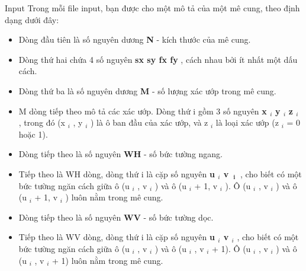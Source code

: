 Input
Trong mỗi file input, bạn được cho một mô tả của một mê cung, theo định dạng dưới đây:
\begin{itemize}
	\item Dòng đầu tiên là số nguyên dương \textbf{ N } - kích thước của mê cung.
	\item Dòng thứ hai chứa 4 số nguyên \textbf{ sx sy fx fy } , cách nhau bởi ít nhất một dấu cách.
	\item Dòng thứ ba là số nguyên dương \textbf{ M } - số lượng xác ướp trong mê cung.
	\item M dòng tiếp theo mô tả các xác ướp. Dòng thứ i gồm 3 số nguyên \textbf{ x $_ i $}\textbf{ y $_ i $}\textbf{ z $_ i $} , trong đó (x $_ i $ , y $_ i $ ) là ô ban đầu của xác ướp, và z $_ i $ là loại xác ướp (z $_ i $ = 0 hoặc 1).
	\item Dòng tiếp theo là số nguyên \textbf{ WH } - số bức tường ngang.
	\item Tiếp theo là WH dòng, dòng thứ i là cặp số nguyên \textbf{ u $_ i $ v }$_\textbf{ i }$ , cho biết có một bức tường ngăn cách giữa ô (u $_ i $ , v $_ i $ ) và ô (u $_ i $ + 1, v $_ i $ ). Ô (u $_ i $ , v $_ i $ ) và ô (u $_ i $ + 1, v $_ i $ ) luôn nằm trong mê cung.
	\item Dòng tiếp theo là số nguyên \textbf{ WV } - số bức tường dọc.
	\item Tiếp theo là WV dòng, dòng thứ i là cặp số nguyên \textbf{ u $_ i $ v $_ i $} , cho biết có một bức tường ngăn cách giữa ô (u $_ i $ , v $_ i $ ) và ô (u $_ i $ , v $_ i $ + 1). Ô (u $_ i $ , v $_ i $ ) và ô (u $_ i $ , v $_ i $ + 1) luôn nằm trong mê cung.
\end{itemize}